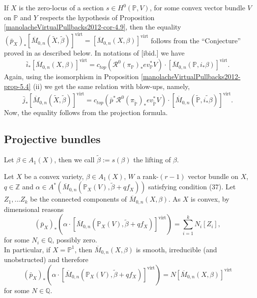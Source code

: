 \begin{remark}\label{manolacheVirtualPullbacks2012-rem-5.17}
 If $X$ is the zero-locus of a section $s\in H^0(\mathbb{P}, V)$, for some convex vector bundle $V$ on $\mathbb{P}$ and $Y$ respects the hypothesis of Proposition \ref{manolacheVirtualPullbacks2012-cor-4.9}, then the equality $(\bar{p}_X)_*[\overline{M}_{0,n}(\tilde{X}, \tilde{\beta})]^{\mathrm{virt}}=[\overline{M}_{0,n}(X,\beta)]^{\mathrm{virt}}$ follows from the ``Conjecture'' proved in \cite{K:01} as described below. In notations of [ibid.] we have
\begin{equation*}
 \bar{i}_*[\overline{M}_{0,n}(X,\beta)]^{\mathrm{virt}}=c_{top}(\mathcal{R}^0(\pi_{\mathbb{P}})_*ev_{\mathbb{P}}^*V )\cdot[\overline{M}_{0,n}(\mathbb{P},i_*\beta)]^{\mathrm{virt}}.
\end{equation*}
Again, using the isomorphism in Proposition \ref{manolacheVirtualPullbacks2012-prop-5.4} (ii) we get the same relation with blow-ups, namely,
\begin{equation*}
 \bar{j}_*[\overline{M}_{0,n}(\tilde{X},\tilde{\beta})]^{\mathrm{virt}}=c_{top}(\bar{p}^*\mathcal{R}^0(\pi_{\tilde{\mathbb{P}}})_*ev_{\tilde{\mathbb{P}}}^*V)\cdot [\overline{M}_{0,n}(\tilde{\mathbb{P}},\widetilde{i_*\beta})]^{\mathrm{virt}}.
\end{equation*}
Now, the equality follows from the projection formula.
\end{remark}

\subsection{Projective bundles}\label{manolacheVirtualPullbacks2012-sec-5.4}

\begin{definition}\label{manolacheVirtualPullbacks2012-def-5.18}
Let $\beta\in A_1(X)$, then we call $\tilde{\beta}:=s(\beta)$ the lifting of $\beta$.
\end{definition}

\begin{remark}\label{manolacheVirtualPullbacks2012-rem-5.19}
\label{manolacheVirtualPullbacks2012-smirr}
Let $X$ be a convex variety, $\beta\in A_1(X)$, $W$ a rank-$(r-1)$ vector bundle on $X$, $q\in\mathbb{Z}$ and $\alpha\in A^*(\overline{M}_{0,n}(\mathbb{P}_X(V),\tilde{\beta}+qf_X))$ satisfying condition (37). Let $Z_1,...Z_k$ be the connected components of $\overline{M}_{0,n}(X,\beta)$. As $X$ is convex, by dimensional reasons $$(\bar{p}_X)_* \left(\alpha\cdot[\overline{M}_{0,n}(\mathbb{P}_X(V),\tilde{\beta}+qf_X)]^{\mathrm{virt}}\right)=\sum_{i=1}^k N_i[Z_i],$$ for some $N_i\in\mathbb{Q}$, possibly zero.
\\In particular, if $X=\mathbb{P}^1$, then $\overline{M}_{0,n}(X,\beta)$ is smooth, irreducible (and unobstructed) and therefore $$(\bar{p}_X)_*\left(\alpha\cdot[\overline{M}_{0,n}(\mathbb{P}_X(V),\tilde{\beta}+qf_X)]^{\mathrm{virt}}\right)=N[\overline{M}_{0,n}(X,\beta)]^{\mathrm{virt}}$$ for some $N\in\mathbb{Q}$.
\end{remark}

